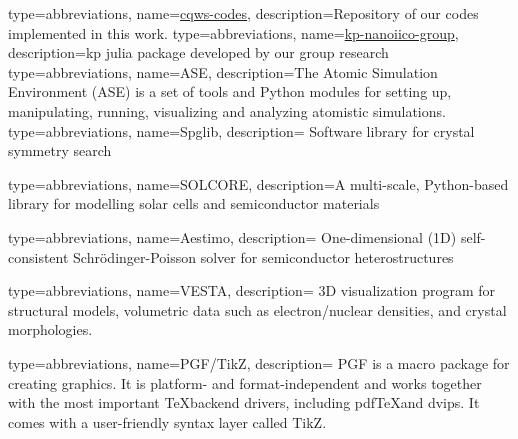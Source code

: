 
{ type=abbreviations,
    name={\href{https://github.com/NanophotonIICOs/cqws-codes.git}{cqws-codes}},
    description={Repository of our codes implemented in this work. }
    \cite{cqws-codes}
}
{ type=abbreviations,
    name={\href{https://github.com/NanophotonIICOs/kp-nanoiico-group.git}{kp-nanoiico-group}},
    description={\gls{kp} julia\cite{Julia-2017} package developed by our group research}
    \cite{kp-nanoiico-group}
}
{ type=abbreviations,
    name={ASE},
    description={The Atomic Simulation Environment (ASE) is a set of tools and Python modules for setting up, 
    manipulating, running, visualizing and analyzing atomistic simulations. \cite{ask2017ase}}
}
{ 
    type=abbreviations,
    name={Spglib},
    description=
    {
    Software library for crystal symmetry search\cite{togo2018textttspglib}
    }
}

{ type=abbreviations,
    name={SOLCORE},
    description={A multi-scale, Python-based library for modelling solar cells and semiconductor materials
     \cite{alonso2018solcore}}
}

{ type=abbreviations,
    name={Aestimo},
    description=
    {
    One-dimensional (1D) self-consistent Schrödinger-Poisson solver for 
    semiconductor heterostructures
    \cite{hebal2021general}
    }
}

{ type=abbreviations,
    name={VESTA},
    description=
    {
    3D visualization program for structural models, volumetric data such as electron/nuclear 
    densities, and crystal morphologies. 
    \cite{momma2011vesta}
    }
}

{ 
    type=abbreviations,
    name={PGF/TikZ},
    description=
    {
    PGF is a macro package for creating graphics. It is platform- and format-independent and works together 
    with the most important \TeX backend drivers, including pdf\TeX  and dvips. It comes with a user-friendly 
    syntax layer called TikZ. 
    \cite{pgftikz}
    }
}

